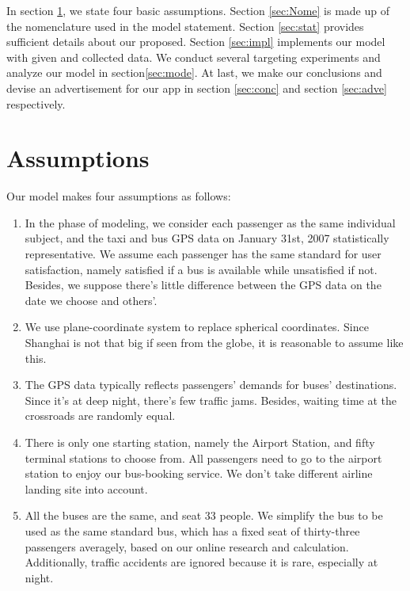 \documentclass{mcmthesis}
\begin{document}
In section \ref{sec:assu}, we state four basic assumptions. Section \ref{sec:Nome} is made up of the nomenclature used in the model statement. Section \ref{sec:stat} provides sufficient details about our proposed. Section \ref{sec:impl} implements our model with given and collected data. We conduct several targeting experiments and analyze our model in section\ref{sec:mode}. At last, we make our conclusions and devise an advertisement for our app in section \ref{sec:conc} and section \ref{sec:adve} respectively.

\section{Assumptions}\label{sec:assu}

Our model makes four assumptions as follows:

\begin{enumerate}
	\item In the phase of modeling, we consider each passenger as the same individual subject, and the taxi and bus GPS data on January 31st, 2007 statistically representative. We assume each passenger has the same standard for user satisfaction, namely satisfied if a bus is available while unsatisfied if not. Besides, we suppose there's little difference between the GPS data on the date we choose and others'.
	\item We use plane-coordinate system to replace spherical coordinates. Since Shanghai is not that big if seen from the globe, it is reasonable to assume like this.
	\item The GPS data typically reflects passengers' demands for buses' destinations. Since it's at deep night, there's few traffic jams. Besides, waiting time at the crossroads are randomly equal. 
	\item There is only one starting station, namely the Airport Station, and fifty terminal stations to choose from. All passengers need to go to the airport station to enjoy our bus-booking service. We don't take different airline landing site into account. 
	\item All the buses are the same, and seat 33 people. We simplify the bus to be used as the same standard bus, which has a fixed seat of thirty-three passengers averagely, based on our online research and calculation. Additionally, traffic accidents are ignored because it is rare, especially at night.
\end{enumerate}
\end{document}
